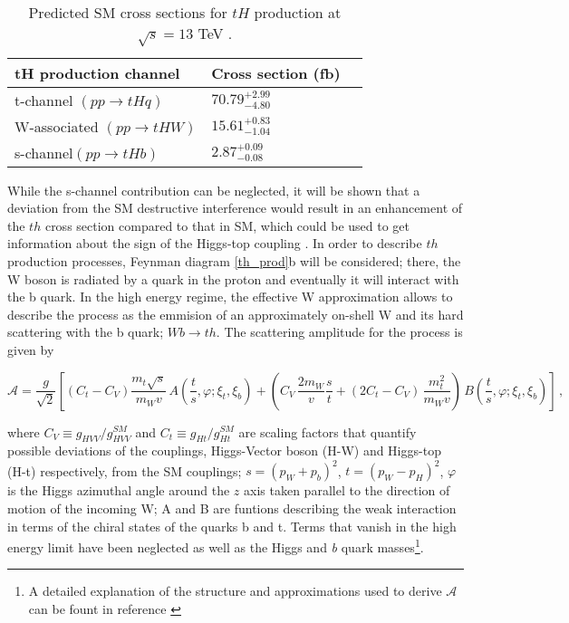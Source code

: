 \begin{center}
\begin{table}[h]
\centering
\begin{tabular}{lll}\hline
tH production channel       & Cross section (fb)      \\\hline
t-channel $(pp \to tHq)$    & $70.79^{+2.99}_{-4.80}$ \\
W-associated $(pp \to tHW)$ & $15.61^{+0.83}_{-1.04}$ \\
s-channel$(pp \to tHb)$     & $ 2.87^{+0.09}_{-0.08}$ \\\hline
\end{tabular}
\caption[Predicted SM cross sections for tH production at $\sqrt{s}=13$ TeV.]{Predicted SM cross sections for $tH$ production at $\sqrt{s}=13$ TeV \cite{thqw_xsec, thb_xsec}.}\label{tab:th_xsec}
\end{table}
\end{center}

\noindent While the s-channel contribution can be neglected, it will be shown that a deviation from the SM destructive interference would result in an enhancement of the $th$ cross section compared to that in SM, which could be used to get information about the sign of the Higgs-top coupling \cite{farina,tait}. In order to describe $th$ production processes, Feynman diagram \ref{th_prod}b will be considered; there, the W boson is radiated by a quark in the proton and eventually it will interact with the b quark. In the high energy regime, the effective W approximation\cite{dawson} allows to describe the process as the emmision of an approximately on-shell W and its hard scattering with the b quark; \ie $Wb \to th$. The scattering amplitude for the process is given by

\begin{equation} \label{s_amp}
\mathcal{A}= \frac{g}{\sqrt{2}}\left[(C_{t}-C_{V})\frac{m_{t}\sqrt{s}}{m_{W}v}\,A\left(\frac{t}{s},\varphi; \xi_{t},\xi_{b}\right)+\left(C_{V}\,\frac{2m_{W}}{v}\frac{s}{t}+(2C_{t}-C_{V})\,\frac{m_{t}^{2}}{m_{W}v}\right)\,B\left(\frac{t}{s},\varphi; \xi_{t},\xi_{b}\right)\right]\,,
\end{equation}

\noindent where $C_{V}\equiv g_{HVV}/g_{HVV}^{SM}$ and $C_{t}\equiv g_{Ht}/g_{Ht}^{SM}$ are scaling factors that quantify possible deviations of the couplings, Higgs-Vector boson (H-W) and Higgs-top (H-t) respectively, from the SM couplings; $s=(p_{W}+p_{b})^{2}$, $t=(p_{W}-p_{H})^{2}$, $\varphi$ is the Higgs azimuthal angle around the $z$ axis taken parallel to the direction of motion of the incoming W; A and B are funtions describing the weak interaction in terms of the chiral states of the quarks b and t. Terms that vanish in the high energy limit have been neglected as well as the Higgs and \textit{b} quark masses\footnote{A detailed explanation of the structure and approximations used to derive $\mathcal{A}$ can be fount in reference \cite{farina}}.\\        

